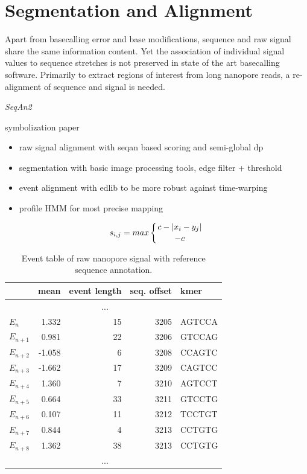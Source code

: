 \section{Segmentation and Alignment}
\label{sec:signal:alignment}

Apart from basecalling error and base modifications, sequence and raw signal share the same information content. Yet the association of individual signal values to sequence stretches is not preserved in state of the art basecalling software. Primarily to extract regions of interest from long nanopore reads, a re-alignment of sequence and signal is needed.

\textit{SeqAn2} \cite{Reinert2017}

symbolization paper \cite{Lin2003}

\begin{itemize}
	\item raw signal alignment with seqan based scoring and semi-global dp
	\item segmentation with basic image processing tools, edge filter + threshold
	\item event alignment with edlib to be more robust against time-warping
	\item profile HMM for most precise mapping
\end{itemize}

\begin{equation}
s_{i,j} = max \left\lbrace c - \left| x_{i} - y_{j} \right| \atop -c \right.
\end{equation}

\begin{table}[ht]
	\centering
	\caption[Event detection and annotation]{Event table of raw nanopore signal with reference sequence annotation.}
	\label{tab:signal:events}
	\begin{tabular}{l|r|r|r|l}
		 & mean & event length & seq. offset & kmer \\
		\hline 
		& \multicolumn{3}{c|}{...} &  \\
		\hline
		$ E_{n} $ &  1.332  & 15 & 3205 & AGTCCA \\
		\rowcolor{LightOrange}
		$ E_{n+1} $ &  0.981  & 22 & 3206 & GTCCAG \\
		$ E_{n+2} $ & -1.058  &  6 & 3208 & CCAGTC \\
		$ E_{n+3} $ & -1.662  & 17 & 3209 & CAGTCC \\
		$ E_{n+4} $ &  1.360  &  7 & 3210 & AGTCCT \\
		$ E_{n+5} $ &  0.664  & 33 & 3211 & GTCCTG \\
		$ E_{n+6} $ &  0.107  & 11 & 3212 & TCCTGT \\
		\rowcolor{LightGreen}
		$ E_{n+7} $ &  0.844  &  4 & 3213 & CCTGTG \\
		\rowcolor{LightGreen}
		$ E_{n+8} $ &  1.362  & 38 & 3213 & CCTGTG \\
		\hline
		& \multicolumn{3}{c|}{...} &  \\
	\end{tabular} 
\end{table}


